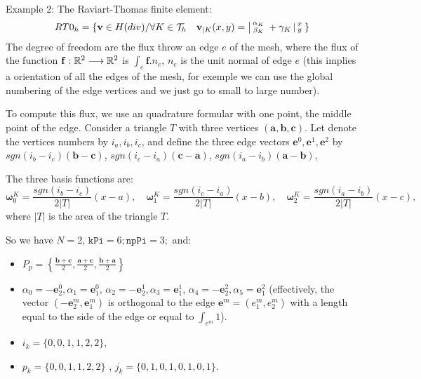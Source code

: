  Example 2: The Raviart-Thomas finite element: 
\begin{equation}
         RT0_{h} = \{ \mathbf{v} \in H(div) / \forall K \in
         \mathcal{T}_{h} \quad  \mathbf{v}_{|K}(x,y) =
         \left|\begin{smallmatrix} \alpha_{K} \\ \beta_{K} \end{smallmatrix}\right. + \gamma_{K}\left|\begin{smallmatrix} x \\ y \end{smallmatrix}\right.  \}
         \label{eq:RT0-fe}
\end{equation}
 The degree of freedom are the flux   throw an edge $e$ of the mesh, where the flux of
 the function $\mathbf{f} : \mathbb{R}^2 \longrightarrow \mathbb{R}^2 $ is $\int_{e} \mathbf{f}.n_{e}$,
 $n_{e}$ is the unit normal of edge $e$ (this implies a orientation of all the edges of the mesh,
 for exemple we can use the global numbering of the edge vertices and we just go to small to large number).
 
 
  To compute this flux, we use an quadrature formular with one point, the middle point of the edge. Consider a triangle $T$ with three vertices $(\mathbf{a},\mathbf{b},\mathbf{c})$. 
Let denote the  vertices numbers by $i_{a},i_{b},i_{c}$, and define the three edge vectors $\mathbf{e}^{0},\mathbf{e}^{1},\mathbf{e}^{2}$ 
by $ sgn(i_{b}-i_{c})(\mathbf{b}-\mathbf{c})$, $sgn(i_{c}-i_{a})(\mathbf{c}-\mathbf{a})$, $sgn(i_{a}-i_{b})(\mathbf{a}-\mathbf{b})$, 
  
 The three basis functions are:
\begin{equation}
 \boldsymbol{\omega}^{K}_{0}= \frac{sgn(i_{b}-i_{c})}{2|T|}(x-a),\quad  \boldsymbol{\omega}^{K}_{1}= \frac{sgn(i_{c}-i_{a})}{2|T|}(x-b),\quad  \boldsymbol{\omega}^{K}_{2}= \frac{sgn(i_{a}-i_{b})}{2|T|}(x-c),
\end{equation}
where $|T|$ is the area of the triangle $T$.
  
So we have  $N=2$, $\mathtt{kPi}=6; \mathtt{npPi}=3;$ and:
\begin{itemize}
\item $
P_{p} = \left\{\frac{\mathbf{b}+\mathbf{c}}{2},
\frac{\mathbf{a}+\mathbf{c}}{2}, 
\frac{\mathbf{b}+\mathbf{a}}{2} \right\}$

\item 
 $\alpha_{0}= - \mathbf{e}^{0}_{2}, \alpha_{1}= \mathbf{e}^{0}_{1}$,  
 $\alpha_{2}= - \mathbf{e}^{1}_{2}, \alpha_{3}= \mathbf{e}^{1}_{1}$,   
 $\alpha_{4}= - \mathbf{e}^{2}_{2}, \alpha_{5}= \mathbf{e}^{2}_{1}$ (effectively, the vector 
 $ ( -\mathbf{e}^{m}_{2}, \mathbf{e}^{m}_{1}) $ is orthogonal to the edge $\mathbf{e}^{m}= (e^m_{1},e^m_{2})$ with 
 a length equal to the side of the edge or equal to  $\int_{e^m} 1$).
\item $i_{k}=\{0,0,1,1,2,2\}$, 
\item $p_{k}=\{0,0,1,1,2,2\}$ ,  $j_{k}=\{0,1,0,1,0,1,0,1\}$.
\end{itemize}
    

